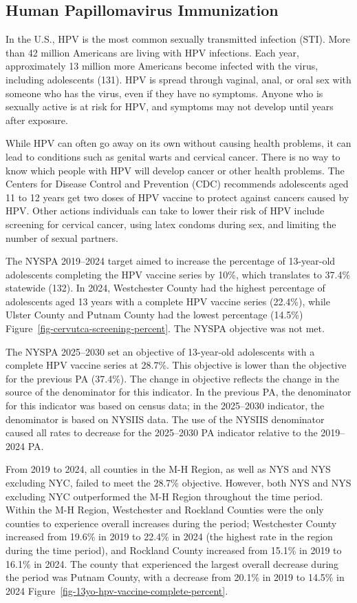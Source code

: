 \documentclass[
  english,
  letterpaper,
]{report}
\begin{document}
\subsection{Human Papillomavirus
Immunization}\label{human-papillomavirus-immunization}

In the U.S., HPV is the most common sexually transmitted infection
(STI). More than 42 million Americans are living with HPV infections.
Each year, approximately 13 million more Americans become infected with
the virus, including adolescents (131). HPV is spread through vaginal,
anal, or oral sex with someone who has the virus, even if they have no
symptoms. Anyone who is sexually active is at risk for HPV, and symptoms
may not develop until years after exposure.

While HPV can often go away on its own without causing health problems,
it can lead to conditions such as genital warts and cervical cancer.
There is no way to know which people with HPV will develop cancer or
other health problems. The Centers for Disease Control and Prevention
(CDC) recommends adolescents aged 11 to 12 years get two doses of HPV
vaccine to protect against cancers caused by HPV. Other actions
individuals can take to lower their risk of HPV include screening for
cervical cancer, using latex condoms during sex, and limiting the number
of sexual partners.

The NYSPA 2019--2024 target aimed to increase the percentage of
13-year-old adolescents completing the HPV vaccine series by 10\%, which
translates to 37.4\% statewide (132). In 2024, Westchester County had
the highest percentage of adolescents aged 13 years with a complete HPV
vaccine series (22.4\%), while Ulster County and Putnam County had the
lowest percentage (14.5\%) Figure~\ref{fig-cervutca-screening-percent}.
The NYSPA objective was not met.

The NYSPA 2025--2030 set an objective of 13-year-old adolescents with a
complete HPV vaccine series at 28.7\%. This objective is lower than the
objective for the previous PA (37.4\%). The change in objective reflects
the change in the source of the denominator for this indicator. In the
previous PA, the denominator for this indicator was based on census
data; in the 2025--2030 indicator, the denominator is based on NYSIIS
data. The use of the NYSIIS denominator caused all rates to decrease for
the 2025--2030 PA indicator relative to the 2019--2024 PA.

From 2019 to 2024, all counties in the M-H Region, as well as NYS and
NYS excluding NYC, failed to meet the 28.7\% objective. However, both
NYS and NYS excluding NYC outperformed the M-H Region throughout the
time period. Within the M-H Region, Westchester and Rockland Counties
were the only counties to experience overall increases during the
period; Westchester County increased from 19.6\% in 2019 to 22.4\% in
2024 (the highest rate in the region during the time period), and
Rockland County increased from 15.1\% in 2019 to 16.1\% in 2024. The
county that experienced the largest overall decrease during the period
was Putnam County, with a decrease from 20.1\% in 2019 to 14.5\% in 2024
Figure~\ref{fig-13yo-hpv-vaccine-complete-percent}.
\end{document}

